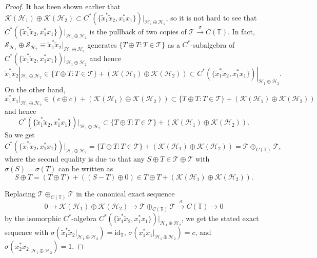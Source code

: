 \begin{proof}
It has been shown earlier that $\mathcal{K}( \mathcal{H}_{1})
\oplus\mathcal{K}( \mathcal{H}_{2}) \subset C^{\ast}(
\{ \tilde{x}_{1}^{\ast}\tilde{x}_{2},x_{1}^{\ast}x_{1}\} )
|_{\mathcal{H}_{1}\oplus\mathcal{H}_{2}}$, so it is not hard to see that
$C^{\ast}( \{ \tilde{x}_{1}^{\ast}\tilde{x}_{2},x_{1}^{\ast}%
x_{1} \} ) |_{\mathcal{H}_{1}\oplus\mathcal{H}_{2}}$ is the
pullback of two copies of $\mathcal{T}\overset{\sigma}{\rightarrow}C(
\mathbb{T}) $. In fact, $\mathcal{S}_{\mathcal{H}_{1}}\oplus
\mathcal{S}_{\mathcal{H}_{2}}\equiv\tilde{x}_{1}^{\ast}\tilde{x}%
_{2}|_{\mathcal{H}_{1}\oplus\mathcal{H}_{2}}$ generates $ \{ T\oplus
T\colon T\in\mathcal{T} \} $ as a $C^*$-subalgebra of $C^{\ast}( \{
\tilde{x}_{1}^{\ast}\tilde{x}_{2},x_{1}^{\ast}x_{1} \} )
|_{\mathcal{H}_{1}\oplus\mathcal{H}_{2}}$ and hence%
\[
\tilde{x}_{1}^{\ast}\tilde{x}_{2}|_{\mathcal{H}_{1}\oplus\mathcal{H}_{2}}%
\in \{ T\oplus T\colon T\in\mathcal{T} \} +( \mathcal{K}(
\mathcal{H}_{1}) \oplus\mathcal{K}( \mathcal{H}_{2})
) \subset C^{\ast}( \{ \tilde{x}_{1}^{\ast}\tilde{x}%
_{2},x_{1}^{\ast}x_{1} \} ) |_{\mathcal{H}_{1}\oplus
\mathcal{H}_{2}}.
\]
On the other hand,
\[
x_{1}^{\ast}x_{1}|_{\mathcal{H}_{1}\oplus\mathcal{H}_{2}}\in( c\oplus
c) +( \mathcal{K}( \mathcal{H}_{1}) \oplus
\mathcal{K}( \mathcal{H}_{2}) ) \subset \{ T\oplus
T\colon T\in\mathcal{T} \} +( \mathcal{K}( \mathcal{H}_{1})
\oplus\mathcal{K}( \mathcal{H}_{2}) )
\]
and hence
\[
C^{\ast}( \{ \tilde{x}_{1}^{\ast}\tilde{x}_{2},x_{1}^{\ast}
x_{1} \} ) |_{\mathcal{H}_{1}\oplus\mathcal{H}_{2}}
\subset \{ T\oplus T\colon T\in\mathcal{T} \} +( \mathcal{K}(
\mathcal{H}_{1}) \oplus\mathcal{K}( \mathcal{H}_{2})) .
\]
So we get
\[
C^{\ast}( \{ \tilde{x}_{1}^{\ast}\tilde{x}_{2},x_{1}^{\ast}%
x_{1} \} ) |_{\mathcal{H}_{1}\oplus\mathcal{H}_{2}}= \{
T\oplus T\colon T\in\mathcal{T} \} +( \mathcal{K}( \mathcal{H}%
_{1}) \oplus\mathcal{K}( \mathcal{H}_{2}) )
=\mathcal{T}\oplus_{C(\mathbb{T}) }\mathcal{T},
\]
where the second equality is due to that any $S\oplus T\in\mathcal{T}%
\oplus\mathcal{T}$ with $\sigma( S) =\sigma(T) $
can be written as
\[
S\oplus T=( T\oplus T) +( ( S-T)
\oplus0) \in T\oplus T+( \mathcal{K}( \mathcal{H}
_{1}) \oplus\mathcal{K}( \mathcal{H}_{2}) ) .
\]

Replacing $\mathcal{T}\oplus_{C(\mathbb{T}) }\mathcal{T}$ in the
canonical exact sequence
\[
0\rightarrow\mathcal{K}( \mathcal{H}_{1}) \oplus\mathcal{K}%
( \mathcal{H}_{2}) \rightarrow\mathcal{T}\oplus_{C(
\mathbb{T}) }\mathcal{T}\overset{\sigma}{\rightarrow}C(
\mathbb{T}) \rightarrow0
\]
by the isomorphic $C^*$-algebra $C^{\ast}( \{ \tilde{x}_{1}^{\ast
}\tilde{x}_{2},x_{1}^{\ast}x_{1} \} ) |_{\mathcal{H}_{1}%
\oplus\mathcal{H}_{2}}$, we get the stated exact sequence with $\sigma(
\tilde{x}_{1}^{\ast}\tilde{x}_{2}|_{\mathcal{H}_{1}\oplus\mathcal{H}_{2}%
}) =\mathrm{id}_{\mathbb{T}}$, $\sigma( x_{1}^{\ast}%
x_{1}|_{\mathcal{H}_{1}\oplus\mathcal{H}_{2}}) =c$, and $\sigma(
x_{2}^{\ast}x_{2}|_{\mathcal{H}_{1}\oplus\mathcal{H}_{2}}) =1$.
\end{proof}


